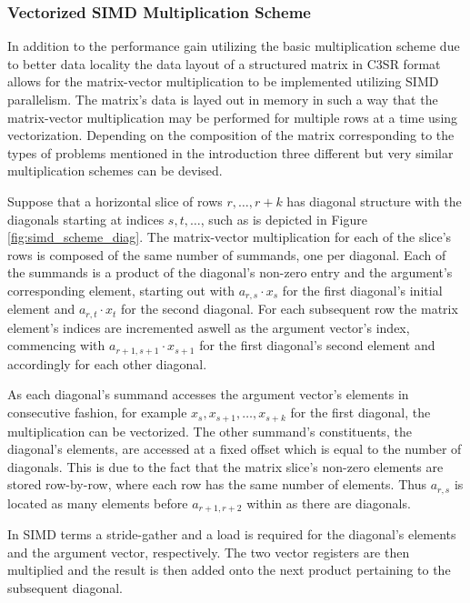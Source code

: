 \documentclass{article}
\begin{document}
    \subsubsection{Vectorized SIMD Multiplication Scheme} \label{subsubsec:vectorized-simd-multiplication-scheme}

      In addition to the performance gain utilizing the basic multiplication scheme due to better data locality the data layout of a structured matrix in C3SR format allows for the matrix-vector multiplication to be implemented utilizing SIMD parallelism. The matrix's data is layed out in memory in such a way that the matrix-vector multiplication may be performed for multiple rows at a time using vectorization. Depending on the composition of the matrix corresponding to the types of problems mentioned in the introduction three different but very similar multiplication schemes can be devised.

      Suppose that a horizontal slice of rows $r, \ldots, r+k$ has diagonal structure with the diagonals starting at indices $s, t, \ldots $, such as is depicted in Figure \ref{fig:simd_scheme_diag}. The matrix-vector multiplication for each of the slice's rows is composed of the same number of summands, one per diagonal. Each of the summands is a product of the diagonal's non-zero entry and the argument's corresponding element, starting out with $a_{r,s} \cdot x_s$ for the first diagonal's initial element and $a_{r,t} \cdot x_t$ for the second diagonal. For each subsequent row the matrix element's indices are incremented aswell as the argument vector's index, commencing with $a_{r+1, s+1} \cdot x_{s+1}$ for the first diagonal's second element and accordingly for each other diagonal.

      As each diagonal's summand accesses the argument vector's elements in consecutive fashion, for example $x_s, x_{s+1}, \ldots, x_{s + k}$ for the first diagonal, the multiplication can be vectorized. The other summand's constituents, the diagonal's elements, are accessed at a fixed offset which is equal to the number of diagonals. This is due to the fact that the matrix slice's non-zero elements are stored row-by-row, where each row has the same number of elements. Thus $a_{r,s}$ is located as many elements before $a_{r+1, r+2}$ within \V as there are diagonals.

      In SIMD terms a stride-gather and a load is required for the diagonal's elements and the argument vector, respectively. The two vector registers are then multiplied and the result is then added onto the next product pertaining to the subsequent diagonal.
\end{document}

